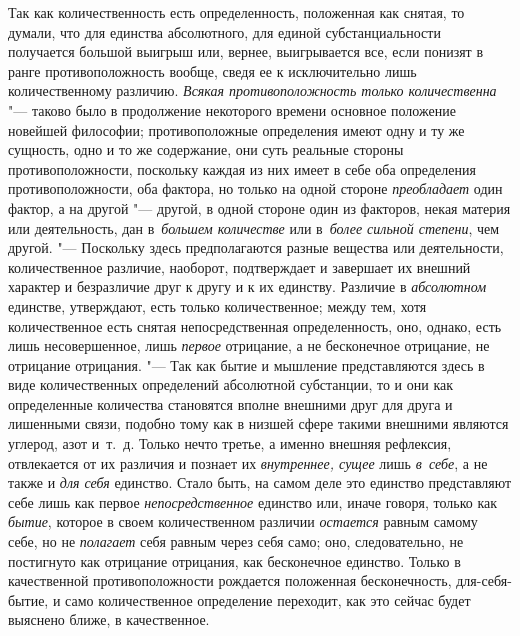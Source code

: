 \label{bkm:bm69a}Так как количественность есть определенность, положенная как
снятая, то думали, что для единства абсолютного, для единой субстанциальности
получается большой выигрыш или, вернее, выигрывается все, если понизят в ранге
противоположность вообще, сведя ее к исключительно лишь количественному
различию. {\em Всякая противоположность только количественна} "--- таково было
в продолжение некоторого времени основное положение новейшей
философии; противоположные определения
имеют одну и ту же сущность, одно и то же содержание, они суть реальные стороны
противоположности, поскольку каждая из них имеет в себе оба определения
противоположности, оба фактора, но только на одной стороне {\em преобладает}
один фактор, а на другой "--- другой, в одной стороне один из факторов, некая
материя или деятельность, дан в~{\em большем количестве} или
в~{\em более сильной степени}, чем другой. "--- Поскольку здесь предполагаются
разные вещества или деятельности, количественное различие, наоборот,
подтверждает и завершает их внешний характер и безразличие друг к другу и к их
единству. Различие в {\em абсолютном} единстве, утверждают, есть только
количественное; между тем, хотя количественное есть снятая непосредственная
определенность, оно, однако, есть лишь несовершенное, лишь {\em первое}
отрицание, а не бесконечное отрицание, не отрицание отрицания. "--- Так как
бытие и мышление представляются здесь в виде количественных определений
абсолютной субстанции, то и они как определенные количества становятся вполне
внешними друг для друга и лишенными связи, подобно тому как в низшей сфере
такими внешними являются углерод, азот и~т.~д. Только нечто третье, а именно
внешняя рефлексия, отвлекается от их различия и познает их
{\em внутреннее, сущее} лишь {\em в~себе}, а не также и {\em для себя}
единство. Стало быть, на самом деле это единство представляют себе лишь как
первое {\em непосредственное} единство или, иначе говоря, только как
{\em бытие}, которое в своем количественном различии {\em остается} равным
самому себе, но не {\em полагает} себя равным через себя само; оно,
следовательно, не постигнуто как отрицание отрицания, как бесконечное единство.
Только в качественной противоположности рождается положенная бесконечность,
для-себя-бытие, и само количественное определение переходит, как это сейчас
будет выяснено ближе, в качественное.

